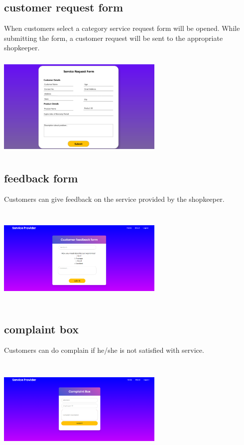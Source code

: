 \documentclass[conference]{IEEEtran}
\begin{document}
\subsection{customer request form}
When customers select a category service request form will be opened. While
submitting the form, a customer request will be sent to the
appropriate shopkeeper.
\graphicspath{ {./request/} }
\includegraphics[width=8cm , height=5cm]{request}

\subsection{feedback form}
Customers can give feedback on the service provided by the shopkeeper.
\graphicspath{ {./feedback/} }
\includegraphics[width=8cm , height=5cm]{feedback}

\subsection{complaint box}
Customers can do complain if he/she is not satisfied with service.
\graphicspath{ {./complaint/} }
\includegraphics[width=8cm , height=5cm]{complaint}
\end{document}
